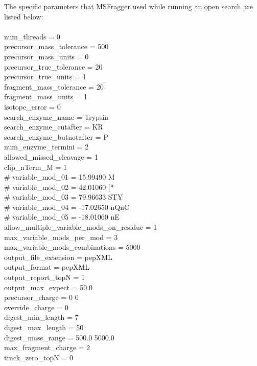 \documentclass [11pt] {article}
\begin{document}
	The specific parameters that MSFragger used while running an open search are listed below: \\\\
	num\_threads = 0 \\
	precursor\_mass\_tolerance = 500 \\
	precursor\_mass\_units = 0 \\		
	precursor\_true\_tolerance = 20 \\
	precursor\_true\_units = 1 \\	
	fragment\_mass\_tolerance = 20 \\
	fragment\_mass\_units = 1 \\		
	isotope\_error = 0 \\		
	search\_enzyme\_name = Trypsin \\
	search\_enzyme\_cutafter = KR \\
	search\_enzyme\_butnotafter = P \\
	num\_enzyme\_termini = 2 \\			
	allowed\_missed\_cleavage = 1 \\		
	clip\_nTerm\_M = 1 \\
	\# variable\_mod\_01 = 15.99490 M \\
	\# variable\_mod\_02 = 42.01060 [* \\
	\# variable\_mod\_03 = 79.96633 STY \\
	\# variable\_mod\_04 = -17.02650 nQnC \\
	\# variable\_mod\_05 = -18.01060 nE \\
	allow\_multiple\_variable\_mods\_on\_residue = 1 \\		
	max\_variable\_mods\_per\_mod = 3 \\
	max\_variable\_mods\_combinations = 5000 \\			
	output\_file\_extension = pepXML \\
	output\_format = pepXML \\
	output\_report\_topN = 1 \\
	output\_max\_expect = 50.0 \\
	precursor\_charge = 0 0 \\	
	override\_charge = 0 \\	
	digest\_min\_length = 7 \\
	digest\_max\_length = 50 \\
	digest\_mass\_range = 500.0 5000.0 \\		
	max\_fragment\_charge = 2 \\		
	track\_zero\_topN = 0 \\	
\end{document}
